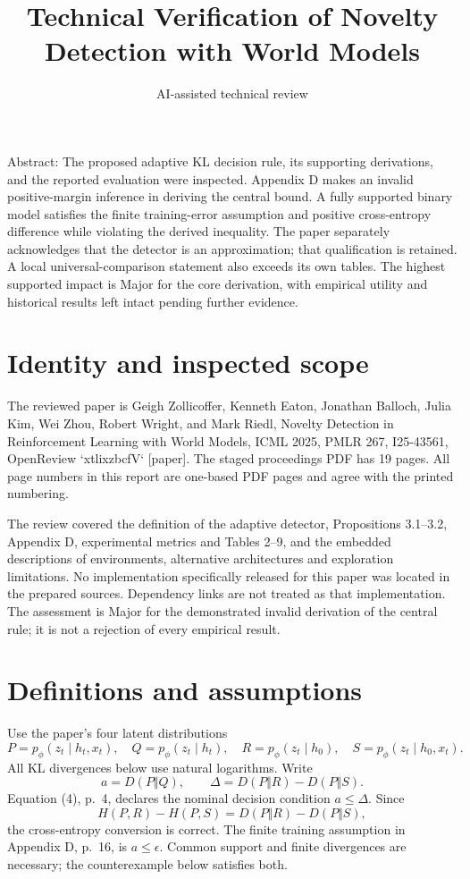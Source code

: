 \documentclass[10pt]{article}
\title{Technical Verification of Novelty Detection with World Models}
\author{AI-assisted technical review}
\date{}
\begin{document}
\maketitle
Abstract: The proposed adaptive KL decision rule, its supporting derivations, and the reported evaluation were inspected. Appendix D makes an invalid positive-margin inference in deriving the central bound. A fully supported binary model satisfies the finite training-error assumption and positive cross-entropy difference while violating the derived inequality. The paper separately acknowledges that the detector is an approximation; that qualification is retained. A local universal-comparison statement also exceeds its own tables. The highest supported impact is Major for the core derivation, with empirical utility and historical results left intact pending further evidence.\par
\section*{Identity and inspected scope}
The reviewed paper is Geigh Zollicoffer, Kenneth Eaton, Jonathan Balloch, Julia Kim, Wei Zhou, Robert Wright, and Mark Riedl, Novelty Detection in Reinforcement Learning with World Models, ICML 2025, PMLR 267, I25-43561, OpenReview `xtlixzbcfV` [paper]. The staged proceedings PDF has 19 pages. All page numbers in this report are one-based PDF pages and agree with the printed numbering.\par
The review covered the definition of the adaptive detector, Propositions 3.1–3.2, Appendix D, experimental metrics and Tables 2–9, and the embedded descriptions of environments, alternative architectures and exploration limitations. No implementation specifically released for this paper was located in the prepared sources. Dependency links are not treated as that implementation. The assessment is Major for the demonstrated invalid derivation of the central rule; it is not a rejection of every empirical result.\par
\section*{Definitions and assumptions}
Use the paper’s four latent distributions \[P=p_\phi(z_t\mid h_t,x_t),\quad Q=p_\phi(z_t\mid h_t),\quad
 R=p_\phi(z_t\mid h_0),\quad S=p_\phi(z_t\mid h_0,x_t).\] All KL divergences below use natural logarithms. Write \[a=D(P\Vert Q),\qquad
 \Delta=D(P\Vert R)-D(P\Vert S).\] Equation (4), p. 4, declares the nominal decision condition \(a\le\Delta\). Since \[H(P,R)-H(P,S)=D(P\Vert R)-D(P\Vert S),\] the cross-entropy conversion is correct. The finite training assumption in Appendix D, p. 16, is \(a\le\epsilon\). Common support and finite divergences are necessary; the counterexample below satisfies both.\par
\end{document}
